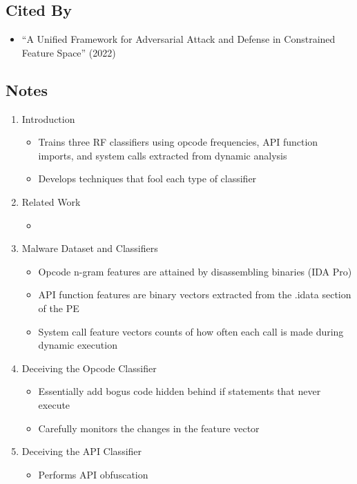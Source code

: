\documentclass{article}
\begin{document}
\subsection*{Cited By}
\begin{itemize}
	\item ``A Unified Framework for Adversarial Attack and Defense in Constrained Feature Space'' (2022)
\end{itemize}

\subsection*{Notes}

\begin{enumerate}
	\item Introduction
	\begin{itemize}
		\item Trains three RF classifiers using opcode frequencies, API function imports, and system calls extracted from dynamic analysis
		\item Develops techniques that fool each type of classifier
	\end{itemize}
	\item Related Work
	\begin{itemize}
		\item 
	\end{itemize}
	\item Malware Dataset and Classifiers
	\begin{itemize}
		\item Opcode n-gram features are attained by disassembling binaries (IDA Pro)
		\item API function features are binary vectors extracted from the .idata section of the PE
		\item System call feature vectors counts of how often each call is made during dynamic execution
	\end{itemize}
	\item Deceiving the Opcode Classifier
	\begin{itemize}
		\item Essentially add bogus code hidden behind if statements that never execute
		\item Carefully monitors the changes in the feature vector
	\end{itemize}
	\item Deceiving the API Classifier
	\begin{itemize}
		\item Performs API obfuscation

\end{itemize}
\end{enumerate}
\end{document}
